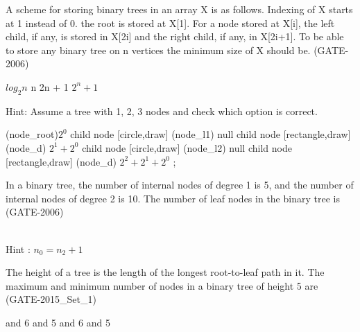 \begin{questyle}
  \question  A scheme for storing binary trees in an array X is as follows. Indexing of X
            starts at 1 instead of 0. the root is stored at X[1]. For a node stored at X[i], the
            left child, if any, is stored in X[2i] and the right child, if any, in X[2i+1]. To
            be able to store any binary tree on n vertices the minimum size of X should be.  (GATE-2006)

  \begin{oneparchoices}
    \choice         \(log_2n\)
    \choice         n
    \choice         2n + 1
    \CorrectChoice  \(2^n + 1\)
  \end{oneparchoices}

  Hint: Assume a tree with 1, 2, 3 nodes and check which option is correct.

    \begin{myTreeLThree}
       (node_root){\(2^0\)}
        child
        {
            node [circle,draw] (node_l1) {null}
        }
        child
        {
            node [rectangle,draw] (node_d){ \(2^1 + 2^0\) }
            child
            {
                node [circle,draw] (node_l2) {null}
            }
            child
            {
                node [rectangle,draw] (node_d){ \(2^2 + 2^1 + 2^0\) }
            }
        };
    \end{myTreeLThree}

\end{questyle}

\begin{questyle}
  \question  In a binary tree, the number of internal nodes of degree 1 is 5, and the number of
             internal nodes of degree 2 is 10. The number of leaf nodes in the binary tree is  (GATE-2006)

  \begin{oneparchoices}
  \end{oneparchoices}
   \\ Hint :  \( n_0 =  n_2 + 1 \)
  \end{questyle}

\begin{questyle}
  \question  The height of a tree is the length of the longest root-to-leaf path in it. The
             maximum and minimum number of nodes in a binary tree of height 5 are  (GATE-2015\_Set\_1)

  \begin{oneparchoices}
     and 6
     and 5
     and 6
     and 5
  \end{oneparchoices}
\end{questyle}


